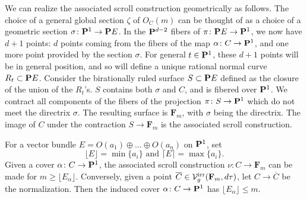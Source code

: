 \documentclass{article}
\renewcommand {\P}{{\bf P}}
\providecommand {\from}{{\colon}}
\newcommand{\V}{\mathcal V}
\newcommand{\F}{{\mathbf F}}
\newcommand{\irr}{{\rm irr}}
\numberwithin{equation}{section}
\begin{document}
\begin{remark}\label{geometricconst} We can realize the associated scroll construction geometrically as follows.  The choice of a general global section $\zeta$ of $O_{C}(m)$ can  be thought of as a choice of a geometric section $\sigma \from \P^1 \to \P E$.  In the $\P^{d-2}$ fibers of $\pi \from  \P E  \to \P^1$, we now have $d+1$ points: $d$ points coming from the fibers of the map $\alpha \from C \to \P^1$, and one more point provided by the section $\sigma$. For general $t \in \P^1$, these $d+1$ points will be in general position, and so will define a unique rational normal curve $R_{t} \subset \P E$. Consider the birationally ruled surface $S \subset \P E$ defined as the closure of the union of the $R_{t}$'s.  $S$ contains both $\sigma$ and $C$, and is fibered over $\P^1$.  We contract all components of the fibers of the projection $\pi \from S \to \P^1$ which do not meet the directrix $\sigma$.  The resulting surface is $\F_{m}$, with $\sigma$ being the directrix. The image of $C$ under the contraction $S \to \F_{m}$ is the associated scroll construction. 

\end{remark}

For a vector bundle $E = O(a_1) \oplus \dots \oplus O(a_n)$ on $\P^1$, set
\[ \lfloor E \rfloor = \min\{a_i\} \text{ and } \lceil E \rceil = \max\{a_i\}.\]
Given a cover $\alpha \from C \to \P^1$, the associated scroll construction $\nu \from C \to \F_m$ can be made for $m \geq \lfloor E_\alpha \rfloor$. Conversely, given a point $\overline C \in \V_g^\irr(\F_m,d\tau)$, let $C \to \overline C$ be the normalization. Then the induced cover $\alpha \from C \to \P^1$ has $\lfloor E_\alpha \rfloor \leq m$.
\end{document}
